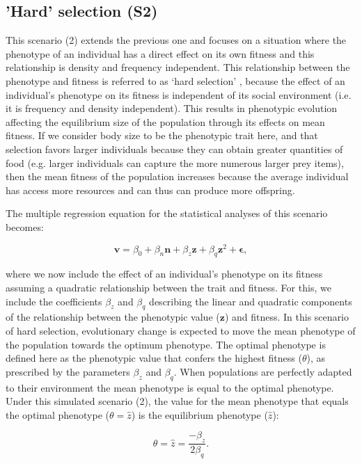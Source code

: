 \documentclass{article}
\begin{document}
\subsection{'Hard' selection (S2)}
This scenario (2) extends the previous one and focuses on a situation where the phenotype of an individual has a direct effect on its own fitness and this relationship is density and frequency independent. This relationship between the phenotype and fitness is referred to as `hard selection' \citep{Wallace1975, Bell2021}, because the effect of an individual's phenotype on its fitness is independent of its social environment (i.e. it is frequency and density independent). This results in phenotypic evolution affecting the equilibrium size of the population through its effects on mean fitness. If we consider body size to be the phenotypic trait here, and that selection favors larger individuals because they can obtain greater quantities of food (e.g. larger individuals can capture the more numerous larger prey items), then the mean fitness of the population increases because the average individual has access more resources and can thus can produce more offspring. 

The multiple regression equation for the statistical analyses of this scenario becomes:

\begin{equation} \label{eq:fitness2}
\bm{v}=\beta_{0} +\beta_{n} \bm{n} + \beta_{z} \bm{z} + \beta_{q} \bm{z}^2 +  \bm{\epsilon},
\end{equation}

\noindent where we now include the effect of an individual's phenotype on its fitness assuming a quadratic relationship between the trait and fitness. For this, we include the coefficients $\beta_{z}$ and $\beta_{q}$ describing the linear and quadratic components of the relationship between the phenotypic value ($\bm{z}$) and fitness. In this scenario of hard selection, evolutionary change is expected to move the mean phenotype of the population towards the optimum phenotype. The optimal phenotype is defined here as the phenotypic value that confers the highest fitness ($\theta$), as prescribed by the parameters $\beta_{z}$ and $\beta_{q}$. When populations are perfectly adapted to their environment the mean phenotype is equal to the optimal phenotype. Under this simulated scenario (2), the value for the mean phenotype that equals the optimal phenotype ($\theta=\hat{z}$) is the equilibrium phenotype ($\hat{z}$):
 
\begin{equation}
\theta=\hat{z}=\frac{-\beta_{z}}{2\beta_{q}}.
\end{equation}
\end{document}
